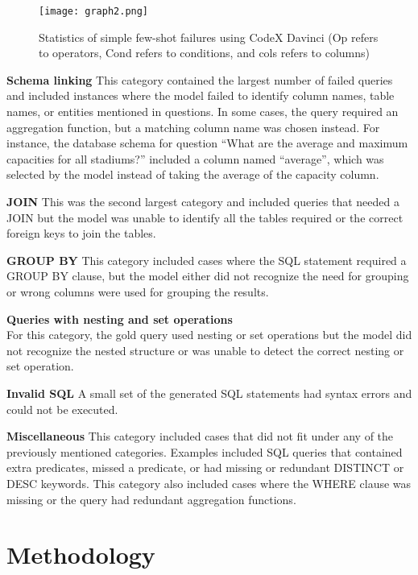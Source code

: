 \begin{wrapfigure}{r}{0.5\textwidth}
  \centering
  \texttt{[image: graph2.png]}
  \caption{Statistics of simple few-shot failures using CodeX Davinci (Op refers to operators, Cond refers to conditions, and cols refers to columns)}
  \label{fig:5}
\end{wrapfigure}

\noindent\textbf{Schema linking}
This category contained the largest number of failed queries and included instances where the model failed to identify column names, table names, or entities mentioned in questions. In some cases, the query required an aggregation function, but a matching column name was chosen instead. For instance, the database schema for question ``What are the average and maximum capacities for all stadiums?'' included a column named ``average'', which was selected by the model instead of taking the average of the capacity column.

\noindent\textbf{JOIN}
This was the second largest category and included queries that needed a JOIN but the model was unable to identify all the tables required or the correct foreign keys to join the tables.

\noindent\textbf{GROUP BY}
This category included cases where the SQL statement required a GROUP BY clause, but the model either did not recognize the need for grouping or wrong columns were used for grouping the results.

\noindent\textbf{Queries with nesting and set operations}\\
For this category, the gold query used nesting or set operations but the model did not recognize the nested structure or was unable to detect the correct nesting or set operation.

\noindent\textbf{Invalid SQL}
A small set of the generated SQL statements had syntax errors and could not be executed. 

\noindent\textbf{Miscellaneous}
This category included cases that did not fit under any of the previously mentioned categories. Examples included SQL queries that contained extra predicates, missed a predicate, or had missing or redundant DISTINCT or DESC keywords. This category also included cases where the WHERE clause was missing or the query had redundant aggregation functions.

\section{Methodology}

